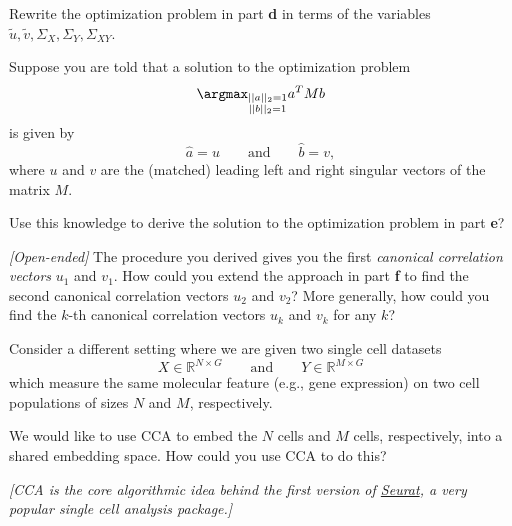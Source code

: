 \documentclass[12pt]{article}
\begin{document}
\begin{subquestions}
Rewrite the optimization problem in part \textbf{d} in terms of the variables $\widetilde{u}, \widetilde{v}, \Sigma_X, \Sigma_Y,\Sigma_{XY}$.

\item Suppose you are told that a solution to the optimization problem
\begin{equation}
    \argmax_{\substack{||a||_2=1 \\ ||b||_2=1}} a^T M b
\end{equation}
is given by
\begin{equation}
    \widehat{a}=u
\qquad\text{and}\qquad
\widehat{b}=v,
\end{equation}
where $u$ and $v$ are the (matched) leading left and right singular vectors of the matrix $M$.

Use this knowledge to derive the solution to the optimization problem in part \textbf{e}?

\item \textit{[Open-ended]} The procedure you derived gives you the first \emph{canonical correlation vectors} $u_1$ and $v_1$. How could you extend the approach in part \textbf{f} to find the second canonical correlation vectors $u_2$ and $v_2$? More generally, how could you find the $k$-th canonical correlation vectors $u_k$ and $v_k$ for any $k$?

\item Consider a different setting where we are given two single cell datasets
\begin{equation}
    X \in \mathbb{R}^{N \times G}
\qquad \text{and} \qquad
Y \in \mathbb{R}^{M \times G}
\end{equation}
which measure the same molecular feature (e.g., gene expression) on two cell populations of sizes $N$ and $M$, respectively.

We would like to use CCA to embed the $N$ cells and $M$ cells, respectively, into a shared embedding space. How could you use CCA to do this?
\end{subquestions}

\textit{[CCA is the core algorithmic idea behind the first version of \href{https://www.nature.com/articles/nbt.4096}{Seurat}, a very popular single cell analysis package.]}

\newpage

\end{document}
